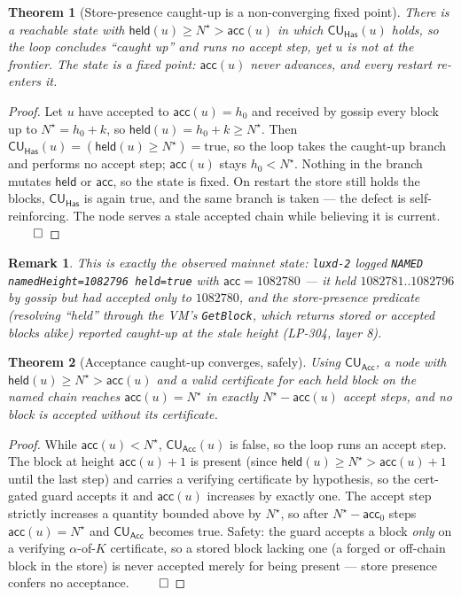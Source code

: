 \documentclass[11pt]{article}
\newtheorem{theorem}{Theorem}
\newtheorem{remark}{Remark}
\begin{document}
\begin{theorem}[Store-presence caught-up is a non-converging fixed point]\label{thm:has}
There is a reachable state with $\mathsf{held}(u)\ge N^\star>\mathsf{acc}(u)$ in which
$\mathsf{CU}_{\mathsf{Has}}(u)$ holds, so the loop concludes ``caught up'' and runs no accept step,
yet $u$ is not at the frontier. The state is a fixed point: $\mathsf{acc}(u)$ never advances, and
every restart re-enters it.
\end{theorem}

\begin{proof}
Let $u$ have accepted to $\mathsf{acc}(u)=h_0$ and received by gossip every block up to
$N^\star=h_0+k$, so $\mathsf{held}(u)=h_0+k\ge N^\star$. Then
$\mathsf{CU}_{\mathsf{Has}}(u)=(\mathsf{held}(u)\ge N^\star)=\text{true}$, so the loop takes the
caught-up branch and performs no accept step; $\mathsf{acc}(u)$ stays $h_0<N^\star$. Nothing in the
branch mutates $\mathsf{held}$ or $\mathsf{acc}$, so the state is fixed. On restart the store still
holds the blocks, $\mathsf{CU}_{\mathsf{Has}}$ is again true, and the same branch is taken --- the
defect is self-reinforcing. The node serves a stale accepted chain while believing it is current.
$\qed$
\end{proof}

\begin{remark}
This is exactly the observed mainnet state: \texttt{luxd-2} logged
\texttt{NAMED namedHeight=1082796 held=true} with $\mathsf{acc}=1082780$ --- it \emph{held}
$1082781..1082796$ by gossip but had \emph{accepted} only to $1082780$, and the store-presence
predicate (resolving ``held'' through the VM's \texttt{GetBlock}, which returns stored \emph{or}
accepted blocks alike) reported caught-up at the stale height (LP-304, layer 8).
\end{remark}

\begin{theorem}[Acceptance caught-up converges, safely]\label{thm:acc}
Using $\mathsf{CU}_{\mathsf{Acc}}$, a node with $\mathsf{held}(u)\ge N^\star>\mathsf{acc}(u)$ and a
valid certificate for each held block on the named chain reaches $\mathsf{acc}(u)=N^\star$ in
exactly $N^\star-\mathsf{acc}(u)$ accept steps, and no block is accepted without its certificate.
\end{theorem}

\begin{proof}
While $\mathsf{acc}(u)<N^\star$, $\mathsf{CU}_{\mathsf{Acc}}(u)$ is false, so the loop runs an
accept step. The block at height $\mathsf{acc}(u)+1$ is present (since
$\mathsf{held}(u)\ge N^\star>\mathsf{acc}(u)+1$ until the last step) and carries a verifying
certificate by hypothesis, so the cert-gated guard accepts it and $\mathsf{acc}(u)$ increases by
exactly one. The accept step strictly increases a quantity bounded above by $N^\star$, so after
$N^\star-\mathsf{acc}_0$ steps $\mathsf{acc}(u)=N^\star$ and $\mathsf{CU}_{\mathsf{Acc}}$ becomes
true. Safety: the guard accepts a block \emph{only} on a verifying $\alpha$-of-$K$ certificate, so a
stored block lacking one (a forged or off-chain block in the store) is never accepted merely for
being present --- store presence confers no acceptance. $\qed$
\end{proof}
\end{document}
